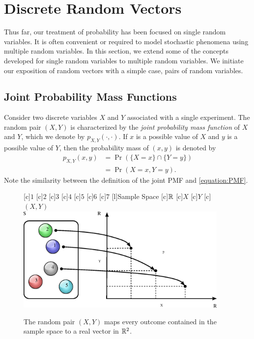 \chapter{Discrete Random Vectors}
\label{chapter:RandomVectorsDiscrete}

Thus far, our treatment of probability has been focused on single random variables.
It is often convenient or required to model stochastic phenomena using multiple random variables.
In this section, we extend some of the concepts developed for single random variables to multiple random variables.
We initiate our exposition of random vectors with a simple case, pairs of random variables.


\section{Joint Probability Mass Functions}

Consider two discrete variables $X$ and $Y$ associated with a single experiment.
The random pair $(X, Y)$ is characterized by the \emph{joint probability mass function} of $X$ and $Y$, which we denote by $p_{X,Y}(\cdot,\cdot)$. 
If $x$ is a possible value of $X$ and $y$ is a possible value of $Y$, then the probability mass of $(x, y)$ is denoted by
\begin{equation*}
\begin{split}
p_{X,Y} (x, y) &= \Pr ( \{ X = x \} \cap \{ Y = y \} ) \\
&= \Pr ( X = x, Y = y ).
\end{split}
\end{equation*}
Note the similarity between the definition of the joint PMF and \eqref{equation:PMF}.

\begin{figure}[ht]
\begin{center}
\begin{psfrags}
[c]{$1$}
[c]{$2$}
[c]{$3$}
[c]{$4$}
[c]{$5$}
[c]{$6$}
[c]{$7$}
[l]{Sample Space}
[c]{$\mathbb{R}$}
[c]{$X$}
[c]{$Y$}
[c]{$(X,Y)$}
\includegraphics[height=5.20cm]{Figures/7Chapter/prv}
\end{psfrags}
\caption{The random pair $(X, Y)$ maps every outcome contained in the sample space to a real vector in $\mathbb{R}^2$.}
\end{center}
\end{figure}

